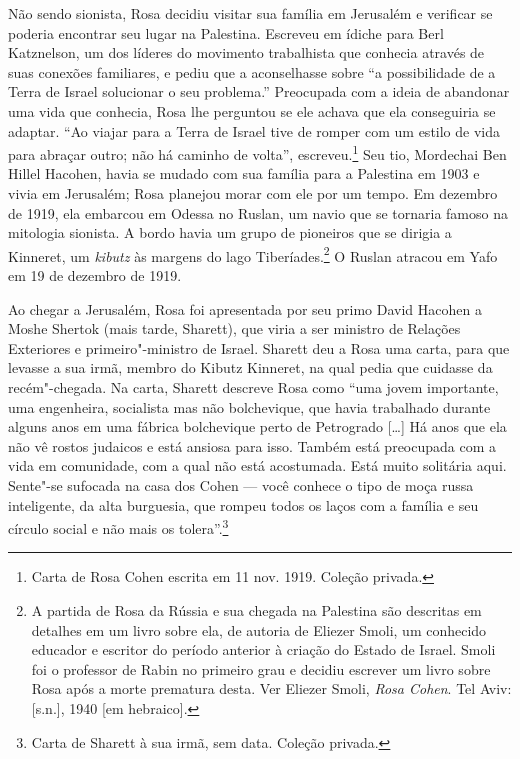Não sendo sionista, Rosa decidiu visitar sua família em Jerusalém e
verificar se poderia encontrar seu lugar na Palestina. Escreveu em
ídiche para Berl Katznelson, um dos líderes do movimento trabalhista
que conhecia através de suas conexões familiares, e pediu que a
aconselhasse sobre ``a possibilidade de a Terra de Israel solucionar o
seu problema.'' Preocupada com a ideia de abandonar uma vida que
conhecia, Rosa lhe perguntou se ele achava que ela conseguiria se
adaptar. ``Ao viajar para a Terra de Israel tive de romper com um estilo
de vida para abraçar outro; não há caminho de volta'', escreveu.\footnote{Carta de Rosa Cohen
escrita em 11 nov. 1919. Coleção privada.} Seu tio, Mordechai Ben
Hillel Hacohen, havia se mudado com sua família para a Palestina em 1903
e vivia em Jerusalém; Rosa planejou morar com ele por um tempo. Em
dezembro de 1919, ela embarcou em Odessa no  Ruslan, um navio
que se tornaria famoso na mitologia sionista. A bordo havia um grupo de
pioneiros que se dirigia a Kinneret, um \emph{kibutz} às margens do lago
Tiberíades.\footnote{A partida de Rosa da Rússia e sua chegada na Palestina são
descritas em detalhes em um livro sobre ela, de autoria de Eliezer Smoli,
um conhecido educador e escritor do período anterior à criação do Estado
de Israel. Smoli foi o professor de Rabin no primeiro grau e decidiu
escrever um livro sobre Rosa após a morte prematura desta. Ver Eliezer
Smoli, \emph{Rosa Cohen}. Tel Aviv: {[}s.n.{]}, 1940 {[}em hebraico{]}.} 
O  Ruslan atracou em Yafo em 19 de dezembro de 1919.

Ao chegar a Jerusalém, Rosa foi apresentada por seu primo David Hacohen
a Moshe Shertok (mais tarde, Sharett), que viria a ser ministro de
Relações Exteriores e primeiro"-ministro de Israel. Sharett deu a Rosa
uma carta, para que levasse a sua irmã, membro do Kibutz Kinneret, na
qual pedia que cuidasse da recém"-chegada. Na carta, Sharett descreve Rosa
como ``uma jovem importante, uma engenheira, socialista mas não
bolchevique, que havia trabalhado durante alguns anos em uma fábrica
bolchevique perto de Petrogrado {[}\ldots{}{]} Há anos que ela não vê rostos judaicos
e está ansiosa para isso. Também está preocupada com a vida em
comunidade, com a qual não está acostumada. Está muito solitária aqui. Sente"-se
sufocada na casa dos Cohen --- você conhece o tipo de moça russa
inteligente, da alta burguesia, que rompeu todos os laços com a família
e seu círculo social e não mais os tolera''.\footnote{Carta de Sharett à sua irmã, sem data. Coleção privada.}


